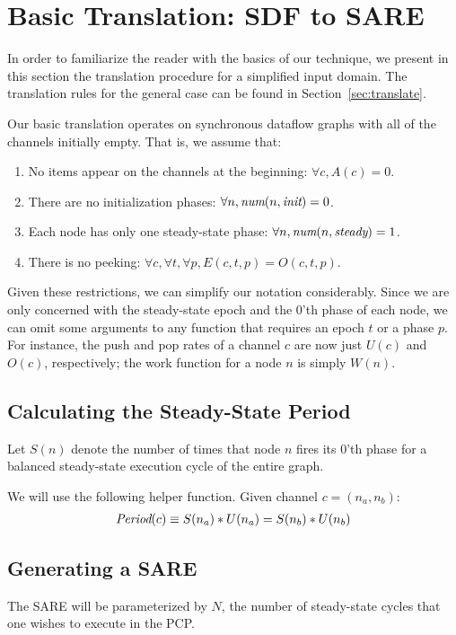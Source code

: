 \section{Basic Translation: SDF to SARE}
\label{sec:simple}

In order to familiarize the reader with the basics of our technique,
we present in this section the translation procedure for a simplified
input domain.  The translation rules for the general case can be found
in Section~\ref{sec:translate}.

Our basic translation operates on synchronous dataflow graphs with all
of the channels initially empty.  That is, we assume that:
\begin{enumerate}

\item No items appear on the channels at the beginning:  $\forall c, A(c) = 0$.

\item There are no initialization phases: $\forall n, \mbox{\it num}(n, \mbox{\it init}) = 0$.

\item Each node has only one steady-state phase: $\forall n, \mbox{\it num}(n, \mbox{\it steady}) = 1$.

\item There is no peeking: $\forall c, \forall t, \forall p, E(c, t, p) = O(c, t, p)$.

\end{enumerate}

Given these restrictions, we can simplify our notation considerably.
Since we are only concerned with the steady-state epoch and the 0'th
phase of each node, we can omit some arguments to any function that
requires an epoch $t$ or a phase $p$.  For instance, the push and pop
rates of a channel $c$ are now just $U(c)$ and $O(c)$, respectively;
the work function for a node $n$ is simply $W(n)$.

\subsection{Calculating the Steady-State Period}

Let $S(n)$ denote the number of times that node $n$ fires its 0'th
phase for a balanced steady-state execution cycle of the entire
graph. 

We will use the following helper function.  Given channel $c = (n_a, n_b)$:
\begin{align*}
\mbox{\it Period}(c) \equiv S(n_a) * U(n_a) = S(n_b) * U(n_b)
\end{align*}

\subsection{Generating a SARE}

The SARE will be parameterized by $N$, the number of steady-state
cycles that one wishes to execute in the PCP.


